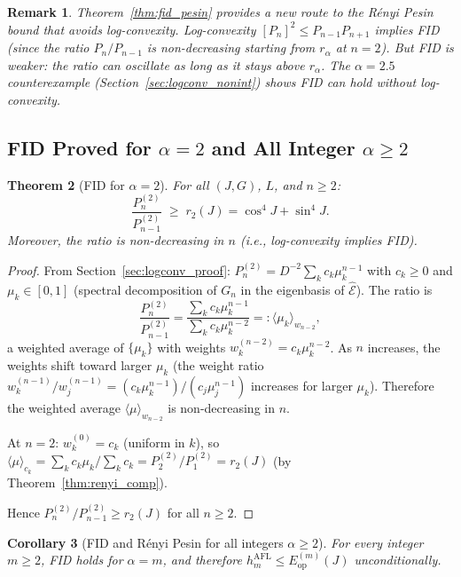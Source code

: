\documentclass[12pt,a4paper]{article}
\newtheorem{theorem}{Theorem}[section]
\newtheorem{corollary}[theorem]{Corollary}
\newtheorem{remark}[theorem]{Remark}
\begin{document}
\begin{remark}
Theorem~\ref{thm:fid_pesin} provides a new route to the Rényi Pesin bound that
avoids log-convexity.  Log-convexity $[P_n]^2\leq P_{n-1}P_{n+1}$ implies FID
(since the ratio $P_n/P_{n-1}$ is non-decreasing starting from $r_\alpha$ at $n=2$).
But FID is weaker: the ratio can oscillate as long as it stays above $r_\alpha$.
The $\alpha=2.5$ counterexample (Section~\ref{sec:logconv_nonint}) shows FID can hold
without log-convexity.
\end{remark}

\subsection{FID Proved for $\alpha=2$ and All Integer $\alpha\geq 2$}
\label{sec:fid_proof_int}

\begin{theorem}[FID for $\alpha=2$]
\label{thm:fid_alpha2}
For all $(J,G)$, $L$, and $n\geq 2$:
\[
  \frac{P_n^{(2)}}{P_{n-1}^{(2)}} \;\geq\; r_2(J) = \cos^4 J + \sin^4 J.
\]
Moreover, the ratio is \emph{non-decreasing} in $n$ (i.e., log-convexity implies FID).
\end{theorem}

\begin{proof}
From Section~\ref{sec:logconv_proof}:
$P_n^{(2)}=D^{-2}\sum_k c_k\mu_k^{n-1}$ with $c_k\geq 0$ and $\mu_k\in[0,1]$
(spectral decomposition of $G_n$ in the eigenbasis of $\hat{\mathcal{E}}$).
The ratio is
\[
  \frac{P_n^{(2)}}{P_{n-1}^{(2)}}
  = \frac{\sum_k c_k\mu_k^{n-1}}{\sum_k c_k\mu_k^{n-2}}
  =: \langle\mu_k\rangle_{w_{n-2}},
\]
a weighted average of $\{\mu_k\}$ with weights $w_k^{(n-2)}=c_k\mu_k^{n-2}$.
As $n$ increases, the weights shift toward larger $\mu_k$ (the weight ratio
$w_k^{(n-1)}/w_j^{(n-1)}=(c_k\mu_k^{n-1})/(c_j\mu_j^{n-1})$ increases for larger $\mu_k$).
Therefore the weighted average $\langle\mu\rangle_{w_{n-2}}$ is non-decreasing in $n$.

At $n=2$: $w_k^{(0)}=c_k$ (uniform in $k$), so
$\langle\mu\rangle_{c_k}=\sum_k c_k\mu_k/\sum_k c_k=P_2^{(2)}/P_1^{(2)}=r_2(J)$
(by Theorem~\ref{thm:renyi_comp}).

Hence $P_n^{(2)}/P_{n-1}^{(2)}\geq r_2(J)$ for all $n\geq 2$. \qedhere
\end{proof}

\begin{corollary}[FID and Rényi Pesin for all integers $\alpha\geq 2$]
\label{cor:fid_int}
For every integer $m\geq 2$, FID holds for $\alpha=m$, and therefore
$h_m^{\mathrm{AFL}}\leq E_{\mathrm{op}}^{(m)}(J)$ unconditionally.
\end{corollary}
\end{document}
